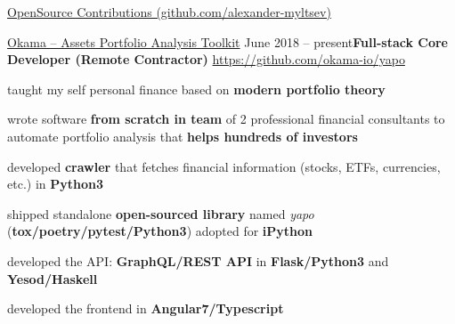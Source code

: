 \documentclass{resume} %
\begin{document}

\begin{rSection}{\href{https://github.com/alexander-myltsev?tab=repositories}{OpenSource
Contributions (github.com/alexander-myltsev)}}

\noindent{}

\begin{samepage}
\begin{rSubsection}{\href{https://github.com/okama-io/yapo}
{Okama -- Assets Portfolio Analysis Toolkit}}
{June 2018 -- present}{\textbf{Full-stack Core Developer (Remote Contractor)}}
{\href{https://github.com/okama-io/yapo}{https://github.com/okama-io/yapo}}
\item taught my self personal finance based on \textbf{modern portfolio theory} 
\item wrote software \textbf{from scratch in team} of 2 professional financial consultants to automate portfolio analysis that \textbf{helps hundreds of investors}
\item developed \textbf{crawler} that fetches financial information (stocks, ETFs, currencies, etc.) in \textbf{Python3}
\item shipped standalone \textbf{open-sourced library} named \textit{yapo} (\textbf{tox/poetry/pytest/Python3}) adopted
for \textbf{iPython}
\item developed the API: \textbf{GraphQL/REST API} in \textbf{Flask/Python3} and \textbf{Yesod/Haskell}
\item developed the frontend in \textbf{Angular7/Typescript}

\end{rSubsection}
\end{samepage}


\end{rSection}
\end{document}
